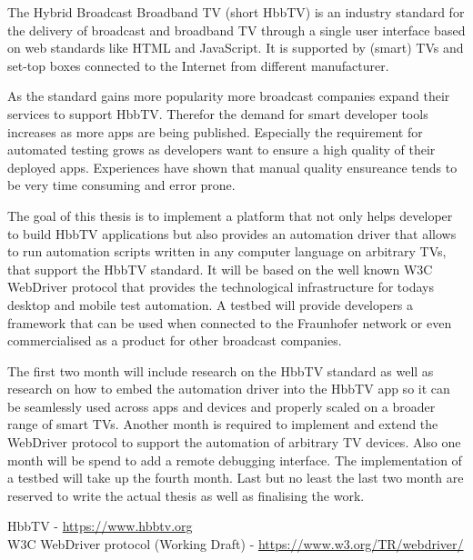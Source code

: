 
The Hybrid Broadcast Broadband TV (short HbbTV) is an industry standard for the delivery of broadcast and broadband TV
through a single user interface based on web standards like HTML and JavaScript. It is supported by (smart) TVs and
set-top boxes connected to the Internet from different manufacturer.


As the standard gains more popularity more broadcast companies expand their services to support HbbTV. Therefor the
demand for smart developer tools increases as more apps are being published. Especially the requirement for
automated testing grows as developers want to ensure a high quality of their deployed apps. Experiences have shown
that manual quality ensureance tends to be very time consuming and error prone.


The goal of this thesis is to implement a platform that not only helps developer to build HbbTV applications but
also provides an automation driver that allows to run automation scripts written in any computer language on
arbitrary TVs, that support the HbbTV standard. It will be based on the well known W3C WebDriver protocol that
provides the technological infrastructure for todays desktop and mobile test automation. A testbed will provide
developers a framework that can be used when connected to the Fraunhofer network or even commercialised as
a product for other broadcast companies.


The first two month will include research on the HbbTV standard as well as research on how to embed the automation driver
into the HbbTV app so it can be seamlessly used across apps and devices and properly scaled on a broader range of
smart TVs. Another month is required to implement and extend the WebDriver protocol to support the automation
of arbitrary TV devices. Also one month will be spend to add a remote debugging interface. The implementation of
a testbed will take up the fourth month. Last but no least the last two month are reserved to write the actual
thesis as well as finalising the work.


HbbTV - \url{https://www.hbbtv.org} \\
W3C WebDriver protocol (Working Draft) - \url{https://www.w3.org/TR/webdriver/}
